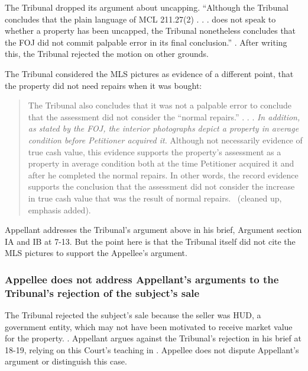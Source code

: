 \documentclass[12pt,\documentclassflag]{michiganCourtOfAppealsBrief}
\begin{document}
The Tribunal dropped its argument about uncapping. ``Although the Tribunal concludes that the plain language of MCL 211.27(2) . . . does not speak to whether a property has been uncapped, the Tribunal nonetheless concludes that the FOJ did not commit palpable error in its final conclusion.'' \reconsiderationDenied[1-2]. After writing this, the Tribunal rejected the motion on other grounds. 

The Tribunal considered the MLS pictures as evidence of a different point, that the property did not need repairs when it was bought:

\begin{quote}
  The Tribunal also concludes that it was not a palpable error to conclude that the assessment did not consider the ``normal repairs.'' . . .
  {\em In addition, as stated by the FOJ, the interior photographs depict a property in average condition before Petitioner acquired it.} Although not necessarily evidence of true cash value, this evidence supports the property's assessment as a property in average condition both at the time Petitioner acquired it and after he completed the normal repairs. In other words, the record evidence supports the conclusion that the assessment did not consider the increase in true cash value that was the result of normal repairs. \reconsiderationDenied[2]\ (cleaned up, emphasis added).
\end{quote}

Appellant addresses the Tribunal's argument above in his brief, Argument section IA and IB at 7-13. But the point here is that the Tribunal itself did not cite the MLS pictures to support the Appellee's argument.

\subsubsection{Appellee does not address Appellant's arguments to the Tribunal's rejection of the subject's sale}

The Tribunal rejected the subject's sale because the seller was HUD, a government entity, which may not have been motivated to receive market value for the property. \reconsiderationDenied[2]. Appellant argues against the Tribunal's rejection in his brief at 18-19, relying on this Court's teaching in \cite{Jones & Laughlin}. Appellee does not dispute Appellant's argument or distinguish this case. 
\end{document}
